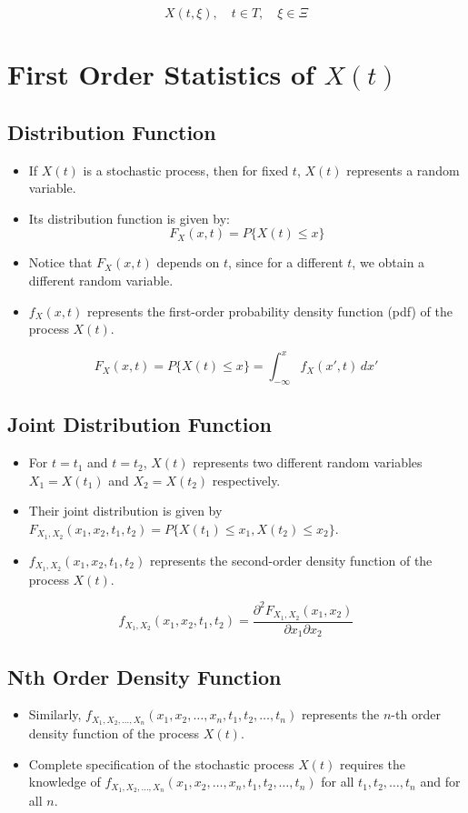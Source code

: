 \documentclass[12pt]{article}
\begin{document}
\[
X(t, \xi), \quad t \in T, \quad \xi \in \Xi
\]

\section{First Order Statistics of \( X(t) \)}
\subsection{Distribution Function}
\begin{itemize}
    \item If \( X(t) \) is a stochastic process, then for fixed \( t \), \( X(t) \) represents a random variable.
    \item Its distribution function is given by:
    \[
    F_X(x,t) = P\{X(t) \leq x\}
    \]
    \item Notice that \( F_X(x,t) \) depends on \( t \), since for a different \( t \), we obtain a different random variable.
    \item \( f_X(x,t) \) represents the first-order probability density function (pdf) of the process \( X(t) \).
\end{itemize}

\[
F_X(x,t) = P\{X(t) \leq x\} = \int_{-\infty}^x f_X(x', t) \, dx'
\]

\subsection{Joint Distribution Function}
\begin{itemize}
    \item For \( t = t_1 \) and \( t = t_2 \), \( X(t) \) represents two different random variables \( X_1 = X(t_1) \) and \( X_2 = X(t_2) \) respectively.
    \item Their joint distribution is given by \( F_{X_1, X_2}(x_1, x_2, t_1, t_2) = P\{X(t_1) \leq x_1, X(t_2) \leq x_2\} \).
    \item \( f_{X_1, X_2}(x_1, x_2, t_1, t_2) \) represents the second-order density function of the process \( X(t) \).
\end{itemize}

\[
f_{X_1, X_2}(x_1, x_2, t_1, t_2) = \frac{\partial^2 F_{X_1, X_2}(x_1, x_2)}{\partial x_1 \partial x_2}
\]

\subsection{Nth Order Density Function}
\begin{itemize}
    \item Similarly, \( f_{X_1, X_2, \ldots, X_n}(x_1, x_2, \ldots, x_n, t_1, t_2, \ldots, t_n) \) represents the \( n \)-th order density function of the process \( X(t) \).
    \item Complete specification of the stochastic process \( X(t) \) requires the knowledge of \( f_{X_1, X_2, \ldots, X_n}(x_1, x_2, \ldots, x_n, t_1, t_2, \ldots, t_n) \) for all \( t_1, t_2, \ldots, t_n \) and for all \( n \).
\end{itemize}
\end{document}
